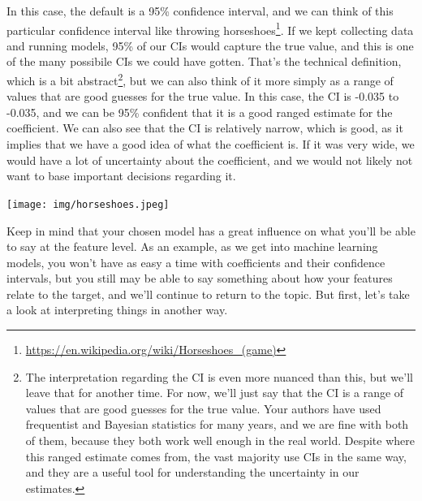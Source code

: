\documentclass[
  letterpaper,
]{krantz}
\DeclareRobustCommand{\href}[2]{#2\footnote{\url{#1}}}
\begin{document}
In this case, the default is a 95\% confidence interval, and we can
think of this particular confidence interval like
\href{https://en.wikipedia.org/wiki/Horseshoes_(game)}{throwing
horseshoes}. If we kept collecting data and running models, 95\% of our
CIs would capture the true value, and this is one of the many possibile
CIs we could have gotten. That's the technical definition, which is a
bit abstract\footnote{The interpretation regarding the CI is even more
  nuanced than this, but we'll leave that for another time. For now,
  we'll just say that the CI is a range of values that are good guesses
  for the true value. Your authors have used frequentist and Bayesian
  statistics for many years, and we are fine with both of them, because
  they both work well enough in the real world. Despite where this
  ranged estimate comes from, the vast majority use CIs in the same way,
  and they are a useful tool for understanding the uncertainty in our
  estimates.}, but we can also think of it more simply as a range of
values that are good guesses for the true value. In this case, the CI is
-0.035 to -0.035, and we can be 95\% confident that it is a good ranged
estimate for the coefficient. We can also see that the CI is relatively
narrow, which is good, as it implies that we have a good idea of what
the coefficient is. If it was very wide, we would have a lot of
uncertainty about the coefficient, and we would not likely not want to
base important decisions regarding it.

\texttt{[image: img/horseshoes.jpeg]}

Keep in mind that your chosen model has a great influence on what you'll
be able to say at the feature level. As an example, as we get into
machine learning models, you won't have as easy a time with coefficients
and their confidence intervals, but you still may be able to say
something about how your features relate to the target, and we'll
continue to return to the topic. But first, let's take a look at
interpreting things in another way.
\end{document}
